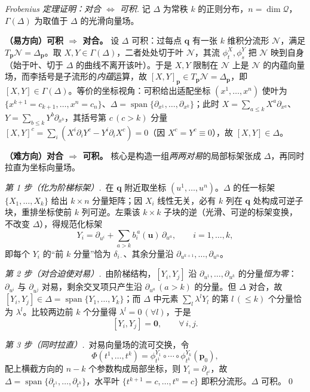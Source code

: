 \begin{proof}[Frobenius 定理证明：对合 $\Leftrightarrow$ 可积]
记 $\Delta$ 为常秩 $k$ 的正则分布，$n=\dim\mathcal Q$，$\Gamma(\Delta)$ 为取值于 $\Delta$ 的光滑向量场。

\textbf{（易方向）可积 $\Rightarrow$ 对合。}\;
设 $\Delta$ 可积：过每点 $\mathbf q$ 有一张 $k$ 维积分流形 $\mathcal N$，满足 $T_{\mathbf p}\mathcal N=\Delta_{\mathbf p}$。取 $X,Y\in\Gamma(\Delta)$，二者处处切于叶 $\mathcal N$，其流 $\phi^X_t,\phi^Y_s$ 把 $\mathcal N$ 映到自身（始于叶、切于 $\Delta$ 的曲线不离开该叶）。于是 $X,Y$ 限制在 $\mathcal N$ 上是 $\mathcal N$ 的内蕴向量场，而李括号是子流形的\emph{内蕴}运算，故 $[X,Y]_{\mathbf p}\in T_{\mathbf p}\mathcal N=\Delta_{\mathbf p}$，即 $[X,Y]\in\Gamma(\Delta)$。等价的坐标视角：可积给出适配坐标 $(x^1,\dots,x^n)$ 使叶为 $\{x^{k+1}=c_{k+1},\dots,x^n=c_n\}$、$\Delta=\operatorname{span}\{\partial_{x^1},\dots,\partial_{x^k}\}$；此时 $X=\sum_{a\le k}X^a\partial_{x^a}$、$Y=\sum_{b\le k}Y^b\partial_{x^b}$，其括号第 $c\,(c>k)$ 分量 $[X,Y]^c=\sum_i(X^i\partial_i Y^c-Y^i\partial_i X^c)=0$（因 $X^c=Y^c\equiv0$），故 $[X,Y]\in\Delta$。

\textbf{（难方向）对合 $\Rightarrow$ 可积。}\;
核心是构造一组\emph{两两对易}的局部标架张成 $\Delta$，再同时拉直为坐标向量场。

\emph{第 1 步（化为阶梯标架）.}\, 在 $\mathbf q$ 附近取坐标 $(u^1,\dots,u^n)$。$\Delta$ 的任一标架 $\{X_1,\dots,X_k\}$ 给出 $k\times n$ 分量矩阵；因 $X_i$ 线性无关，必有 $k$ 列在 $\mathbf q$ 处构成可逆子块，重排坐标使前 $k$ 列可逆。左乘该 $k\times k$ 子块的逆（光滑、可逆的标架变换，不改变 $\Delta$），得规范化标架
\[
  Y_i=\partial_{u^i}+\sum_{a>k}b_i^{\,a}(\mathbf u)\,\partial_{u^a},\qquad i=1,\dots,k,
\]
即每个 $Y_i$ 的“前 $k$ 分量”恰为 $\delta_{i\cdot}$、其余分量沿 $\partial_{u^{k+1}},\dots,\partial_{u^n}$。

\emph{第 2 步（对合迫使对易）.}\, 由阶梯结构，$[Y_i,Y_j]$ 沿 $\partial_{u^1},\dots,\partial_{u^k}$ 的分量\emph{恒为零}：$\partial_{u^i}$ 与 $\partial_{u^j}$ 对易，剩余交叉项只产生沿 $\partial_{u^a}\,(a>k)$ 的分量。但 $\Delta$ 对合，故 $[Y_i,Y_j]\in\Delta=\operatorname{span}\{Y_1,\dots,Y_k\}$；而 $\Delta$ 中元素 $\sum_l\lambda^l Y_l$ 的第 $l\,(\le k)$ 个分量恰为 $\lambda^l$。比较两边前 $k$ 个分量得 $\lambda^l=0\,(\forall l)$，于是
\[
  [Y_i,Y_j]=\mathbf 0,\qquad\forall\,i,j .
\]

\emph{第 3 步（同时拉直）.}\, 对易向量场的流可交换，令
\[
  \Phi(t^1,\dots,t^k)=\phi^{Y_1}_{t^1}\circ\cdots\circ\phi^{Y_k}_{t^k}(\mathbf p_0),
\]
配上横截方向的 $n-k$ 个参数构成局部坐标，则 $Y_i=\partial_{t^i}$，故 $\Delta=\operatorname{span}\{\partial_{t^1},\dots,\partial_{t^k}\}$，水平叶 $\{t^{k+1}=c,\dots,t^n=c\}$ 即积分流形。$\Delta$ 可积。\qed
\end{proof}

